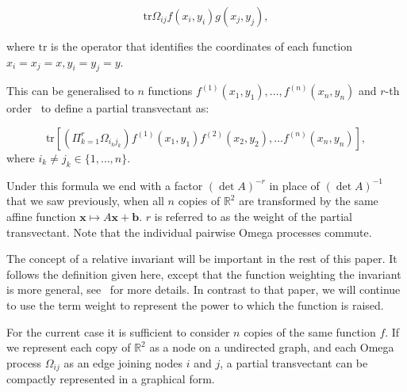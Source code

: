 \documentclass[review,onefignum,onetabnum]{siamonline190516}
\begin{document}
\begin{equation}
\mbox{tr} \Omega_{ij} f(x_i, y_i) g(x_j, y_j),
\end{equation}

\noindent where $\mbox{tr}$  is the operator that identifies the coordinates of each function $x_i = x_j = x, y_i = y_j = y$.

This can be generalised to $n$ functions $f^{(1)}(x_1, y_1), \ldots, f^{(n)}(x_n, y_n)$ and $r$-th order~\cite{OlverEIS} to define a partial transvectant as:

\begin{equation}
\mbox{tr} \left[\left( \Pi_{k=1}^r \Omega_{i_k j_k} \right) f^{(1)}(x_1, y_1)
f^{(2)}(x_2, y_2), \ldots f^{(n)} (x_n, y_n)\right],
\end{equation}
where $i_k \neq j_k \in \{1, \ldots, n\}$.

Under this formula we end with a factor $(\det A)^{-r}$ in place of $(\det
A)^{-1}$ that we saw previously, when all $n$ copies of $\mathbb{R}^2$ are
transformed by the same affine function $\mathbf{x} \mapsto A\mathbf{x} +
\mathbf{b}$. $r$ is referred to as the weight of the partial
transvectant. Note that the individual pairwise Omega processes commute.

The concept of a relative invariant will be important in the rest of this paper. It follows the definition given here, except that the function weighting the invariant is more general, see~\cite{Fels1997} for more details. In contrast to that paper, we will continue to use the term weight to represent the power to which the function is raised.

For the current case it is sufficient to consider $n$ copies of the same
function $f$. If we represent each copy of $\mathbb{R}^2$ as a node on a
undirected graph, and each Omega process $\Omega_{ij}$ as an edge joining
nodes $i$ and $j$, a partial transvectant can be compactly represented in a
graphical form. 
\end{document}
